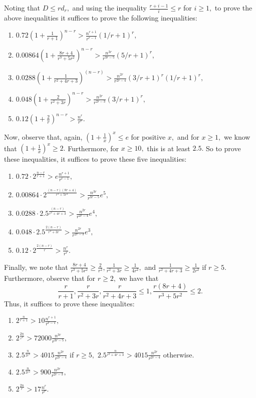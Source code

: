 \documentclass{article}
\theoremstyle{definition}
\theoremstyle{remark}
\begin{document}
Noting that $D \leq rd_r,$ and using the inequality $\frac{r+i - 1}{i} \leq r$ for $i \geq 1,$ to prove the above inequalities it suffices to prove the following inequalities:
\begin{enumerate}
    \item $0.72 (1 + \frac{1}{r+1})^{n-r} >  \frac{n^{r+1}}{r^{r-1}} (1/r + 1)^r,$
    \item $0.00864 (1 + \frac{8r + 4}{r^3 + 5r^2})^{n-r} > \frac{n^{3r}}{r^{3r-5}} (5/r + 1)^r,$
    \item $0.0288 (1 + \frac{1}{r^2 + 4r + 3})^{(n-r)} > \frac{n^{2r}}{r^{2r-4}}(3/r+1)^r(1/r + 1)^r,$
    \item $0.048 (1 + \frac{2}{r^2 + 3r})^{n-r} > \frac{n^{2r}}{r^{2r-3}}(3/r + 1)^r,$
    \item $0.12 (1 + \frac{2}{r})^{n-r} > \frac{n^r}{r^r}.$
\end{enumerate}
Now, observe that, again, $(1 + \frac{1}{x})^x \leq e$ for positive $x,$ and for $x \geq 1,$ we know that $(1 + \frac{1}{x})^x \geq 2.$ Furthermore, for $x \geq 10,$ this is at least $2.5.$ So to prove these inequalities, it suffices to prove these five inequalities:
\begin{enumerate}
    \item $0.72 \cdot 2^{\frac{n-r}{r+1}} >  e \frac{n^{r+1}}{r^{r-1}},$
    \item $0.00864 \cdot 2^{\frac{(n-r)(8r + 4)}{r^3 + 5r^2}} > \frac{n^{3r}}{r^{3r-5}} e^5,$
    \item $0.0288 \cdot 2.5^{\frac{(n-r)}{r^2 + 4r + 3}} > \frac{n^{2r}}{r^{2r-4}}e^4,$
    \item $0.048 \cdot 2.5^{\frac{2(n-r)}{r^2 + 3r}} > \frac{n^{2r}}{r^{2r-3}}e^3,$
    \item $0.12 \cdot 2^{\frac{2(n-r)}{r}} > \frac{n^r}{r^r}.$
\end{enumerate}
Finally, we note that $\frac{8r + 4}{r^3 + 5r^2} \geq \frac{2}{r^2}, \frac{1}{r^2 + 3r} \geq \frac{1}{4r^2},$ and $\frac{1}{r^2 + 4r + 3} \geq \frac{1}{2r^2}$ if $r \geq 5.$ Furthermore, observe that for $r \geq 2,$ we have that \[\frac{r}{r+1}, \frac{r}{r^2 + 3r}, \frac{r}{r^2 + 4r + 3} \leq 1, \frac{r(8r + 4)}{r^3 + 5r^2} \leq 2.\] Thus, it suffices to prove these inequalites:
\begin{enumerate}
    \item $2^{\frac{n}{r+1}} > 10 \frac{n^{r+1}}{r^{r-1}},$
    \item $2^{\frac{2n}{r^2}} > 72000\frac{n^{3r}}{r^{3r-5}},$
    \item $2.5^{\frac{n}{2r^2}} >4015\frac{n^{2r}}{r^{2r-4}}$ if $r \geq 5,$ $2.5^{\frac{n}{r^2 + 4r + 3}} >4015\frac{n^{2r}}{r^{2r-4}}$ otherwise.
    \item $2.5^{\frac{n}{2r^2}} > 900\frac{n^{2r}}{r^{2r-3}},$
    \item $2^{\frac{2n}{r}} > 17\frac{n^r}{r^r}.$
\end{enumerate}
\end{document}

